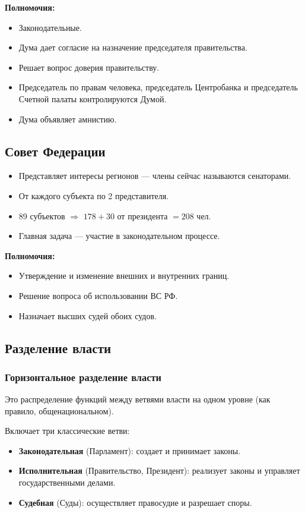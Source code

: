 \documentclass[12pt]{article}
\begin{document}
	\textbf{Полномочия:}
	\begin{itemize}
		\item Законодательные.
		\item Дума дает согласие на назначение председателя правительства.
		\item Решает вопрос доверия правительству.
		\item Председатель по правам человека, председатель Центробанка и председатель Счетной палаты контролируются Думой.
		\item Дума объявляет амнистию.
	\end{itemize}
	
	\subsection{Совет Федерации}
	\begin{itemize}
		\item Представляет интересы регионов --- члены сейчас называются сенаторами.
		\item От каждого субъекта по 2 представителя.
		\item 89 субъектов $\Rightarrow$ $178 + 30$ от президента $= 208$ чел.
		\item Главная задача --- участие в законодательном процессе.
	\end{itemize}
	
	\textbf{Полномочия:}
	\begin{itemize}
		\item Утверждение и изменение внешних и внутренних границ.
		\item Решение вопроса об использовании ВС РФ.
		\item Назначает высших судей обоих судов.
	\end{itemize}
	
	\subsection{Разделение власти}
	
	\subsubsection{Горизонтальное разделение власти}
	
	Это распределение функций между ветвями власти на одном уровне (как правило, общенациональном).
	
	Включает три классические ветви:
	\begin{itemize}
		\item \textbf{Законодательная} (Парламент): создает и принимает законы.
		\item \textbf{Исполнительная} (Правительство, Президент): реализует законы и управляет государственными делами.
		\item \textbf{Судебная} (Суды): осуществляет правосудие и разрешает споры.
	\end{itemize}
	
\end{document}
